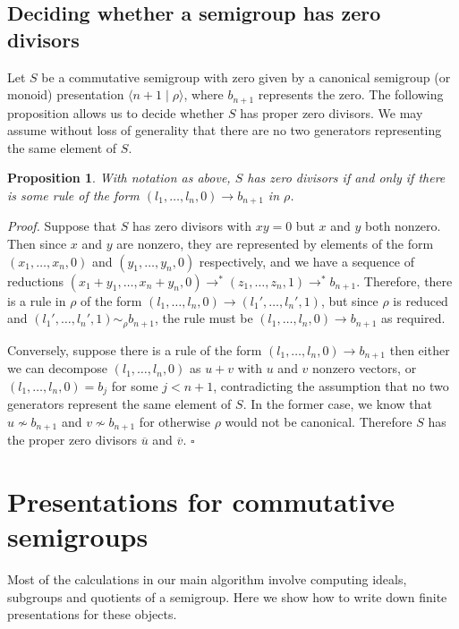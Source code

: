 \documentclass{acmconf}
\newtheorem{proposition}{Proposition}
\begin{document}
\subsection{Deciding whether a semigroup has zero divisors}\label{s:zerodiv}
Let $S$ be a commutative semigroup with zero
given by a canonical semigroup (or monoid)
presentation $\langle n + 1 \mid \rho \rangle$, where $b_{n+1}$
represents the zero. The following proposition allows us to decide
whether $S$ has proper zero divisors. We may assume without loss
of generality that there are no two generators representing the same
element of $S$.

\begin{proposition}
With notation as above, $S$ has zero divisors if and only if
there is some rule of the form $(l_1, \ldots, l_n,0) \rightarrow
b_{n+1}$
in $\rho$.
\end{proposition}
\emph{Proof.} Suppose that $S$ has zero divisors with $xy = 0$ but
$x$ and $y$ both nonzero. Then since $x$ and $y$ are nonzero,
they are represented by elements of the form 
$(x_1, \ldots, x_n,0)$ and $(y_1, \ldots, y_n,0)$
respectively, and we have a sequence of reductions
$(x_1 + y_1, \ldots, x_n + y_n,0) \rightarrow^* (z_1, \ldots, z_n,1)
\rightarrow^* b_{n+1}$.
Therefore, there is a rule in $\rho$ of the form
$(l_1, \ldots, l_n,0) \rightarrow (l_1', \ldots, l_n',1)$, but since
$\rho$ is reduced and $(l_1', \ldots, l_n',1) \sim_\rho b_{n+1}$,
the rule must be $(l_1, \ldots, l_n,0) \rightarrow b_{n+1}$ as required.


Conversely, suppose there is a rule of the form
$(l_1, \ldots, l_n,0) \rightarrow b_{n+1}$ then either
we can decompose $(l_1, \ldots, l_n,0)$ as $u + v$ with
$u$ and $v$ nonzero vectors, or
$(l_1, \ldots, l_n,0) =  b_j$ for some $j < n+1$, contradicting
the assumption that no two generators represent the same element of
$S$. In the former case, we know that $u \not\sim b_{n+1}$ and 
$v \not\sim b_{n+1}$ for otherwise $\rho$ would not be canonical. 
Therefore $S$ has the proper
zero divisors $\overline{u}$ and $\overline{v}$.  $\square$





\section{Presentations for commutative semigroups}
Most of the calculations in our main algorithm 
involve computing
ideals, subgroups and quotients of a semigroup. 
Here we show how to write down finite presentations 
for these objects.
\end{document}
